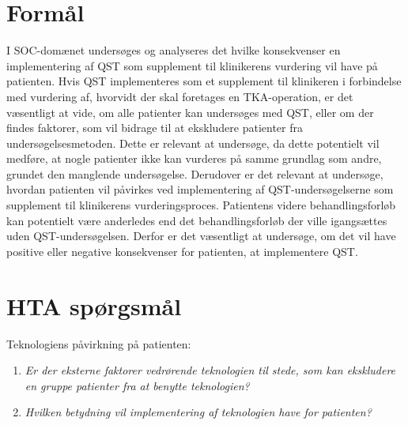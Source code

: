\section{Formål}
I SOC-domænet undersøges og analyseres det hvilke konsekvenser en implementering af QST som supplement til klinikerens vurdering vil have på patienten.
Hvis QST implementeres som et supplement til klinikeren i forbindelse med vurdering af, hvorvidt der skal foretages en TKA-operation, er det væsentligt at vide, om alle patienter kan undersøges med QST, eller om der findes faktorer, som vil bidrage til at ekskludere patienter fra undersøgelsesmetoden. Dette er relevant at undersøge, da dette potentielt vil medføre, at nogle patienter ikke kan vurderes på samme grundlag som andre, grundet den manglende undersøgelse. Derudover er det relevant at undersøge, hvordan patienten vil påvirkes ved implementering af QST-undersøgelserne som supplement til klinikerens vurderingsproces. Patientens videre behandlingsforløb kan potentielt være anderledes end det behandlingsforløb der ville igangsættes uden QST-undersøgelsen. Derfor er det væsentligt at undersøge, om det vil have positive eller negative konsekvenser for patienten, at implementere QST.
 
\section{HTA spørgsmål}
Teknologiens påvirkning på patienten:
\begin{enumerate}
\item \textit{Er der eksterne faktorer vedrørende teknologien til stede, som kan  ekskludere en gruppe patienter fra at benytte teknologien?} %
\item \textit{Hvilken betydning vil implementering af teknologien have for patienten?} %
\end{enumerate}


